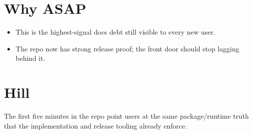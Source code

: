 \section{Why ASAP}\label{record-334-why-asap}

\begin{itemize}
\tightlist
\item
  This is the highest-signal docs debt still visible to every new user.
\item
  The repo now has strong release proof; the front door should stop lagging behind it.
\end{itemize}

\section{Hill}\label{record-334-hill}

The first five minutes in the repo point users at the same package/runtime truth that the implementation and release tooling already enforce.

